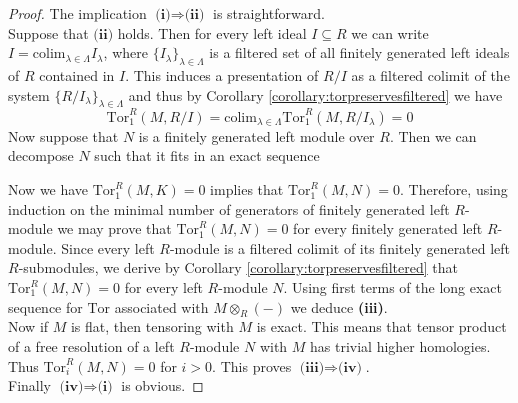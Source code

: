\begin{proof}
The implication $\textbf{(i)}\Rightarrow \textbf{(ii)}$ is straightforward.\\
Suppose that $\textbf{(ii)}$ holds. Then for every left ideal $I\subseteq R$ we can write $I=\mathrm{colim}_{\lambda\in \Lambda}I_{\lambda}$, where $\{I_{\lambda}\}_{\lambda\in \Lambda}$ is a filtered set of all finitely generated left ideals of $R$ contained in $I$. This induces a presentation of $R/I$ as a filtered colimit of the system $\{R/I_{\lambda}\}_{\lambda\in \Lambda}$ and thus by Corollary \ref{corollary:torpreservesfiltered} we have
$$\mathrm{Tor}^R_1(M,R/I)=\mathrm{colim}_{\lambda\in \Lambda}\mathrm{Tor}^R_1(M,R/I_{\lambda})=0$$
Now suppose that $N$ is a finitely generated left module over $R$. Then we can decompose $N$ such that it fits in an exact sequence
\begin{center}
\end{center}
Now we have $\mathrm{Tor}^R_1(M,K)=0$ implies that $\mathrm{Tor}^R_1(M,N)=0$. Therefore, using induction on the minimal number of generators of finitely generated left $R$-module we may prove that $\mathrm{Tor}^R_1(M,N)=0$ for every finitely generated left $R$-module. Since every left $R$-module is a filtered colimit of its finitely generated left $R$-submodules, we derive by Corollary \ref{corollary:torpreservesfiltered} that $\mathrm{Tor}^R_1(M,N)=0$ for every left $R$-module $N$. Using first terms of the long exact sequence for $\mathrm{Tor}$ associated with $M\otimes_R(-)$ we deduce \textbf{(iii)}.\\
Now if $M$ is flat, then tensoring with $M$ is exact. This means that tensor product of a free resolution of a left $R$-module $N$ with $M$ has trivial higher homologies. Thus $\mathrm{Tor}^R_i(M,N)=0$ for $i>0$. This proves $\textbf{(iii)}\Rightarrow \textbf{(iv)}$.\\
Finally $\textbf{(iv)}\Rightarrow \textbf{(i)}$ is obvious.
\end{proof}

